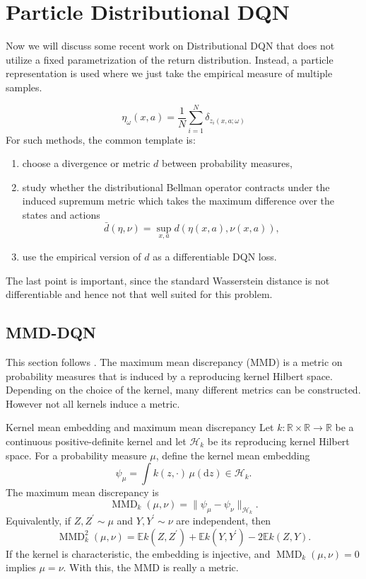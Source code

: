 \documentclass[12pt]{article}
\newcommand{\R}{\mathbb{R}}
\newcommand{\E}{\mathbb{E}}
\newcommand{\1}{\mathds{1}}
\newcommand{\Hcal}{\mathcal{H}}
\newcommand{\MMD}{\operatorname{MMD}}
\newcommand{\norm}[1]{\lVert #1 \rVert}
\begin{document}
\newpage 
\section{Particle Distributional DQN}
Now we will discuss some recent work on Distributional DQN that does not utilize a fixed parametrization of the return distribution. Instead, a particle representation is used where we just take the empirical measure of multiple samples.

$$
  \eta_\omega(x,a)
  =
  \frac1N\sum_{i=1}^N\delta_{z_i(x,a;\omega)}
$$
For such methods, the common template is:
\begin{enumerate}
  \item choose a divergence or metric $d$ between probability measures,
  \item study whether the distributional Bellman operator contracts under the
  induced supremum metric which takes the maximum difference over the states and actions
  $$
    \bar d(\eta,\nu)=\sup_{x,a}d(\eta(x,a),\nu(x,a)),
  $$
  \item use the empirical version of $d$ as a differentiable DQN loss.
\end{enumerate}
The last point is important, since the standard Wasserstein distance is not differentiable and hence not that well suited for this problem. 

\subsection{MMD-DQN}

This section follows \cite{nguyen2020moment}. The maximum mean discrepancy (MMD) is a metric on probability measures that is induced by a reproducing kernel Hilbert space. 
Depending on the choice of the kernel, many different metrics can be constructed. However not all kernels induce a metric. 

\begin{definition}{Kernel mean embedding and maximum mean discrepancy}{}
Let $k:\R\times\R\to\R$ be a continuous positive-definite kernel and let
$\Hcal_k$ be its reproducing kernel Hilbert space. For a probability measure
$\mu$, define the kernel mean embedding
$$
  \psi_\mu
  =
  \int k(z,\cdot)\,\mu(\mathrm dz)
  \in\Hcal_k.
$$
The maximum mean discrepancy is
$$
  \MMD_k(\mu,\nu)
  =
  \norm{\psi_\mu-\psi_\nu}_{\Hcal_k}.
$$
Equivalently, if $Z,Z^{\prime}\sim\mu$ and
$Y,Y^{\prime}\sim\nu$ are independent, then
$$
  \MMD_k^2(\mu,\nu)
  =
  \E k(Z,Z^{\prime})+\E k(Y,Y^{\prime})-2\E k(Z,Y).
$$
If the kernel is characteristic, the embedding is injective, and
$\MMD_k(\mu,\nu)=0$ implies $\mu=\nu$. With this, the MMD is really a metric. 
\end{definition}
\end{document}
